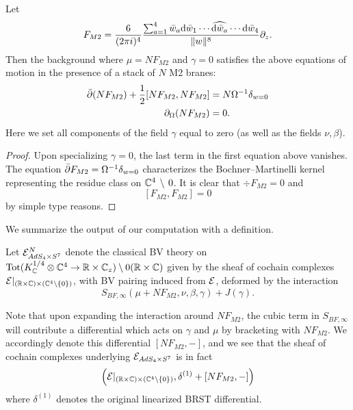 \begin{lem}\label{lem:m2flux}
Let
\[
 F_{M2} = \frac{6}{(2\pi i)^4} \frac{\sum_{a=1}^4 \bar{w}_a \mathrm{d} \bar{w}_1 \cdots \widehat{\mathrm{d} \bar{w}_a} \cdots \mathrm{d} \bar{w}_4}{\|w\|^{8}} \partial_z .
\]
Then the background where $\mu = N F_{M2}$ and $\gamma = 0$
satisfies the above equations of motion in the presence of a stack of $N$ M2 branes:
\begin{align*}
\bar{\partial} (N F_{M2}) + \frac12 [N F_{M2}, N F_{M2}] & = N \Omega^{-1} \delta_{w=0} \\
\partial_{\Omega} (N F_{M2}) & = 0  .
\end{align*}
Here we set all components of the field $\gamma$ equal to zero (as well as the fields $\nu,\beta$). 
\end{lem}

\begin{proof}
Upon specializing $\gamma = 0$, the last term in the first equation above vanishes. The equation $\bar{\partial} F_{M2} = \Omega^{-1} \delta_{w=0}$ characterizes the Bochner--Martinelli kernel representing the residue class on $\mathbb{C}^4 \, \setminus \, 0$. 
It is clear that $\div F_{M2} = 0$ and 
\[
[F_{M2}, F_{M2}] = 0
\] 
by simple type reasons. 
\end{proof}

We summarize the output of our computation with a definition. 

\begin{defn}\label{defn:ads4}
Let $\mathcal{E}^N_{AdS_4\times S^7}$ denote the classical BV theory on $\operatorname{Tot} (K_{\mathbb{C}}^{1/4}\otimes \mathbb{C}^4 \to \mathbb{R}\times \mathbb{C}_z)\setminus 0(\mathbb{R}\times \mathbb{C})$ given by the sheaf of cochain complexes $\mathcal{E} |_{(\mathbb{R}\times \mathbb{C})\times (\mathbb{C}^4\setminus \{0\} )}$, with BV pairing induced from $\mathcal{E}$, deformed by the interaction \[S_{BF,\infty}(\mu + NF_{M2}, \nu, \beta, \gamma) + J(\gamma).\]
\end{defn}

\begin{rmk}
Note that upon expanding the interaction around $NF_{M2}$, the cubic term in $S_{BF,\infty}$ will contribute a differential which acts on $\gamma$ and $\mu$ by bracketing with $NF_{M2}$. We accordingly denote this differential $[NF_{M2}, - ] $, and we see that the sheaf of cochain complexes underlying $\mathcal{E}_{AdS_4\times S^7}$ is in fact \[\left ( \mathcal{E} |_{(\mathbb{R}\times \mathbb{C})\times (\mathbb{C}^4\setminus \{0\} ) }, \delta^{(1)} + [NF_{M2},-] \right )\] where $\delta^{(1)}$ denotes the original linearized BRST differential.
\end{rmk}

